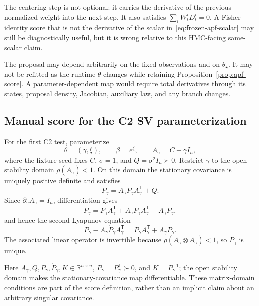 \documentclass[11pt]{article}
\begin{document}
The centering step is not optional: it carries the derivative of the previous
normalized weight into the next step. It also satisfies
$\sum_iW_t^iD_t^i=0$. A Fisher-identity score that is not the derivative of
the scalar in~\eqref{eq:frozen-apf-scalar} may still be diagnostically useful,
but it is wrong relative to this HMC-facing same-scalar claim.

The proposal may depend arbitrarily on the fixed observations and on
$\theta_\star$. It may not be refitted as the runtime $\theta$ changes while
retaining Proposition~\ref{prop:apf-score}. A parameter-dependent map would
require total derivatives through its states, proposal density, Jacobian,
auxiliary law, and any branch changes.

\subsection{Manual score for the C2 SV parameterization}

For the first C2 test, parameterize
\begin{equation}
\theta=(\gamma,\xi),\qquad \beta=e^\xi,\qquad
A_\gamma=C+\gamma I_n,
\end{equation}
where the fixture seed fixes $C$, $\sigma=1$, and
$Q=\sigma^2I_n\succ0$. Restrict $\gamma$ to the open stability domain
$\rho(A_\gamma)<1$. On this domain the stationary covariance is uniquely
positive definite and satisfies
\begin{equation}\label{eq:lyapunov}
P_\gamma=A_\gamma P_\gamma A_\gamma^\mathsf T+Q.
\end{equation}
Since $\partial_\gamma A_\gamma=I_n$, differentiation gives
\[
\dot P_\gamma
=P_\gamma A_\gamma^\mathsf T
 +A_\gamma\dot P_\gamma A_\gamma^\mathsf T
 +A_\gamma P_\gamma,
\]
and hence the second Lyapunov equation
\begin{equation}\label{eq:lyapunov-dot}
\dot P_\gamma-A_\gamma\dot P_\gamma A_\gamma^\mathsf T
=P_\gamma A_\gamma^\mathsf T+A_\gamma P_\gamma.
\end{equation}
The associated linear operator is invertible because
$\rho(A_\gamma\otimes A_\gamma)<1$, so $\dot P_\gamma$ is unique.

Here $A_\gamma,Q,P_\gamma,\dot P_\gamma,K\in\mathbb R^{n\times n}$,
$P_\gamma=P_\gamma^\mathsf T\succ0$, and $K=P_\gamma^{-1}$; the open
stability domain makes the stationary-covariance map differentiable. These
matrix-domain conditions are part of the score definition, rather than an
implicit claim about an arbitrary singular covariance.
\end{document}
